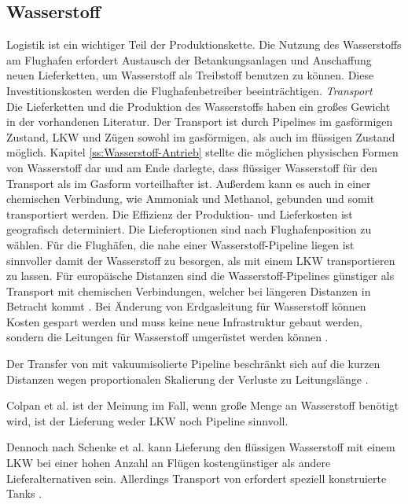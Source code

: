 \subsection{Wasserstoff}
Logistik ist ein wichtiger Teil der Produktionskette. 
Die Nutzung des Wasserstoffs am Flughafen erfordert Austausch der Betankungsanlagen und Anschaffung neuen Lieferketten, 
um Wasserstoff als Treibstoff benutzen zu können. Diese Investitionskosten werden die Flughafenbetreiber beeinträchtigen. 
\textit{Transport}\\
Die Lieferketten und die Produktion des Wasserstoffs haben ein großes Gewicht in der vorhandenen Literatur.
Der Transport ist durch Pipelines im gasförmigen Zustand, LKW und Zügen sowohl im gasförmigen, als auch im flüssigen Zustand möglich. 
Kapitel \ref{ss:Wasserstoff-Antrieb} stellte die möglichen physischen Formen von Wasserstoff dar und am Ende darlegte,
dass flüssiger Wasserstoff für den Transport als im Gasform vorteilhafter ist. 
Außerdem kann es auch in einer chemischen Verbindung, wie Ammoniak und Methanol, gebunden und somit transportiert werden.
%
%
%
% 
Die Effizienz der Produktion- und Lieferkosten ist geografisch determiniert. 
Die Lieferoptionen sind nach Flughafenposition zu wählen. Für die Flughäfen, die nahe einer Wasserstoff-Pipeline liegen ist sinnvoller
damit der Wasserstoff zu besorgen, als mit einem LKW transportieren zu lassen.
%
Für europäische Distanzen sind die Wasserstoff-Pipelines günstiger als Transport mit chemischen Verbindungen, 
welcher bei längeren Distanzen in Betracht kommt \cite{undertaking2022strategic}. 
Bei Änderung von Erdgasleitung für Wasserstoff können Kosten gespart
werden und muss keine neue Infrastruktur gebaut werden, sondern die Leitungen für Wasserstoff umgerüstet werden können \cite{undertaking2022strategic}.

Der Transfer von  mit vakuumisolierte Pipeline beschränkt sich auf die kurzen Distanzen
wegen proportionalen Skalierung der Verluste zu Leitungslänge \cite{colpan2022fuel}.

Colpan et al.\cite{colpan2022fuel} ist der Meinung im Fall, wenn große Menge an Wasserstoff benötigt wird, 
ist der Lieferung weder LKW noch Pipeline sinnvoll. 

Dennoch nach Schenke et al. \cite{schenke2024lh2} kann Lieferung den flüssigen Wasserstoff mit einem LKW bei einer hohen Anzahl an Flügen 
kostengünstiger als andere Lieferalternativen sein. Allerdings Transport von  erfordert speziell konstruierte Tanks \cite{mulder2019outlook}.


